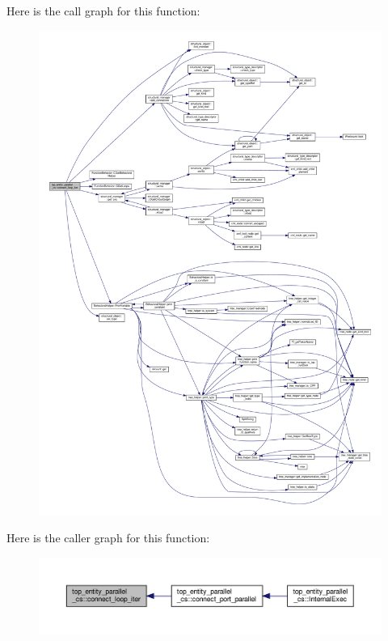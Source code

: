 Here is the call graph for this function\+:
\nopagebreak
\begin{figure}[H]
\begin{center}
\leavevmode
\includegraphics[width=350pt]{d8/d37/classtop__entity__parallel__cs_ac1a4001c3ec07d0ccda26536fe1a9326_cgraph}
\end{center}
\end{figure}
Here is the caller graph for this function\+:
\nopagebreak
\begin{figure}[H]
\begin{center}
\leavevmode
\includegraphics[width=350pt]{d8/d37/classtop__entity__parallel__cs_ac1a4001c3ec07d0ccda26536fe1a9326_icgraph}
\end{center}
\end{figure}
\mbox{\label{classtop__entity__parallel__cs_ae9f5f5887e789f3abb4ee2786f6f9980}} 
